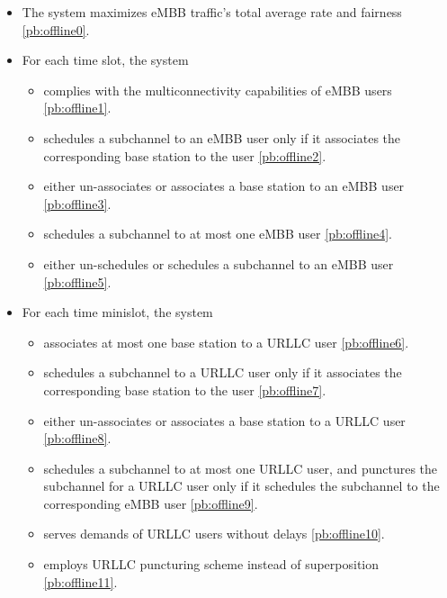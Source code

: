 \begin{frame}
  \begin{itemize}
    \item The system maximizes eMBB traffic's total average rate and fairness \eqref{pb:offline0}.
    \item For each time slot, the system
      \begin{itemize}
        \item complies with the multiconnectivity capabilities of eMBB users \eqref{pb:offline1}.
        \item schedules a subchannel to an eMBB user only if it associates the corresponding base station to the user \eqref{pb:offline2}.
        \item either un-associates or associates a base station to an eMBB user \eqref{pb:offline3}.
        \item schedules a subchannel to at most one eMBB user \eqref{pb:offline4}.
        \item either un-schedules or schedules a subchannel to an eMBB user \eqref{pb:offline5}.
      \end{itemize}
  \end{itemize}
\end{frame}

\begin{frame}
  \begin{itemize}
    \item For each time minislot, the system
      \begin{itemize}
        \item associates at most one base station to a URLLC user \eqref{pb:offline6}.
        \item schedules a subchannel to a URLLC user only if it associates the corresponding base station to the user \eqref{pb:offline7}.
        \item either un-associates or associates a base station to a URLLC user \eqref{pb:offline8}.
        \item schedules a subchannel to at most one URLLC user, and punctures the subchannel for a URLLC user only if it schedules the subchannel to the corresponding eMBB user \eqref{pb:offline9}.
        \item serves demands of URLLC users without delays \eqref{pb:offline10}.
        \item employs URLLC puncturing scheme instead of superposition \eqref{pb:offline11}.
      \end{itemize}
  \end{itemize}
\end{frame}
